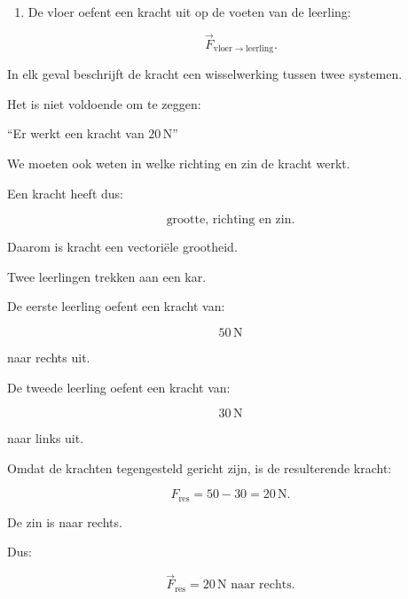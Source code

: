 \documentclass{ximera}
\begin{document}
\begin{oefening}{\oefB\ESS}
\begin{oplossing}
\begin{enumerate}
  \[\boxed{\vec F_{\mathrm{hand}\rightarrow\mathrm{deur}}}.\]

  \item De vloer oefent een kracht uit op de voeten van de leerling:

  \[\boxed{\vec F_{\mathrm{vloer}\rightarrow\mathrm{leerling}}}.\]

\end{enumerate}

In elk geval beschrijft de kracht een wisselwerking tussen twee systemen.

\end{oplossing}

\end{oefening}






Het is niet voldoende om te zeggen:

\begin{center}

``Er werkt een kracht van $20\,\mathrm N$''

\end{center}

We moeten ook weten in welke richting en zin de kracht werkt.

Een kracht heeft dus:

\[\boxed{ \text{grootte, richting en zin}. }\]

Daarom is kracht een vectoriële grootheid.


\begin{voorbeeld}

Twee leerlingen trekken aan een kar.

De eerste leerling oefent een kracht van:

\[50\,\mathrm N\]

naar rechts uit.

De tweede leerling oefent een kracht van:

\[30\,\mathrm N\]

naar links uit.

Omdat de krachten tegengesteld gericht zijn, is de resulterende kracht:

\[F_{\mathrm{res}} = 50-30 = 20\,\mathrm N.\]

De zin is naar rechts.

Dus:

\[\boxed{ \vec F_{\mathrm{res}} = 20\,\mathrm N \text{ naar rechts}. }\]

\end{voorbeeld}
\end{document}
